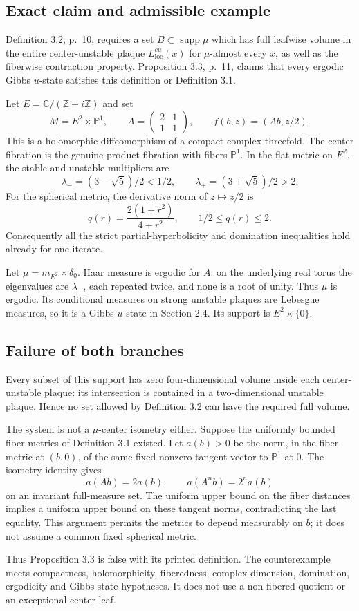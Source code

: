 \documentclass[10pt]{article}
\begin{document}
\subsection*{Exact claim and admissible example}
Definition 3.2, p. 10, requires a set \(B\subset\operatorname{supp}\mu\) which has full leafwise volume in the entire center-unstable plaque \(L^{cu}_{\mathrm{loc}}(x)\) for \(\mu\)-almost every \(x\), as well as the fiberwise contraction property. Proposition 3.3, p. 11, claims that every ergodic Gibbs \(u\)-state satisfies this definition or Definition 3.1.\par
Let \(E=\mathbb C/(\mathbb Z+i\mathbb Z)\) and set \[M=E^2\times\mathbb P^1,\qquad
 A=\begin{pmatrix}2&1\\1&1\end{pmatrix},\qquad
 f(b,z)=(Ab,z/2).\] This is a holomorphic diffeomorphism of a compact complex threefold. The center fibration is the genuine product fibration with fibers \(\mathbb P^1\). In the flat metric on \(E^2\), the stable and unstable multipliers are \[\lambda_-=(3-\sqrt5)/2<1/2,\qquad
 \lambda_+=(3+\sqrt5)/2>2.\] For the spherical metric, the derivative norm of \(z\mapsto z/2\) is \[q(r)=\frac{2(1+r^2)}{4+r^2},\qquad 1/2\le q(r)\le2.\] Consequently all the strict partial-hyperbolicity and domination inequalities hold already for one iterate.\par
Let \(\mu=m_{E^2}\times\delta_0\). Haar measure is ergodic for \(A\): on the underlying real torus the eigenvalues are \(\lambda_\pm\), each repeated twice, and none is a root of unity. Thus \(\mu\) is ergodic. Its conditional measures on strong unstable plaques are Lebesgue measures, so it is a Gibbs \(u\)-state in Section 2.4. Its support is \(E^2\times\{0\}\).\par
\subsection*{Failure of both branches}
Every subset of this support has zero four-dimensional volume inside each center-unstable plaque: its intersection is contained in a two-dimensional unstable plaque. Hence no set allowed by Definition 3.2 can have the required full volume.\par
The system is not a \(\mu\)-center isometry either. Suppose the uniformly bounded fiber metrics of Definition 3.1 existed. Let \(a(b)>0\) be the norm, in the fiber metric at \((b,0)\), of the same fixed nonzero tangent vector to \(\mathbb P^1\) at \(0\). The isometry identity gives \[a(Ab)=2a(b),\qquad a(A^n b)=2^n a(b)\] on an invariant full-measure set. The uniform upper bound on the fiber distances implies a uniform upper bound on these tangent norms, contradicting the last equality. This argument permits the metrics to depend measurably on \(b\); it does not assume a common fixed spherical metric.\par
Thus Proposition 3.3 is false with its printed definition. The counterexample meets compactness, holomorphicity, fiberedness, complex dimension, domination, ergodicity and Gibbs-state hypotheses. It does not use a non-fibered quotient or an exceptional center leaf.\par
\end{document}
